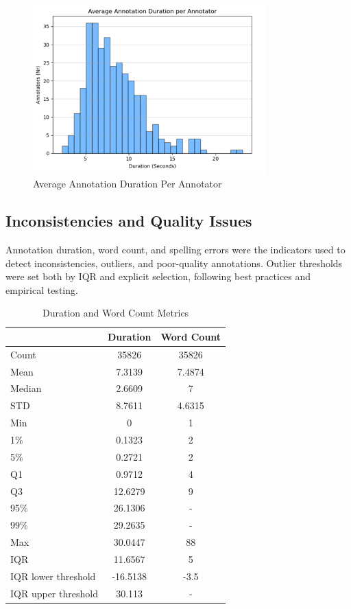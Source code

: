 \documentclass{article}
\begin{document}
\begin{figure}[H]
  \centering
  \includegraphics[width=0.8\textwidth]{figures/annotation_quality/average_annotation_duration_per_annotator.png}
  \caption{Average Annotation Duration Per Annotator}
  \label{fig:avg_duration}
\end{figure}

\subsection{Inconsistencies and Quality Issues}

Annotation duration, word count, and spelling errors were the indicators used to detect inconsistencies, outliers, and poor-quality annotations. Outlier thresholds were set both by IQR and explicit selection, following best practices and empirical testing.

\begin{table}[H]
  \caption{Duration and Word Count Metrics}
  \label{tab:duration_word}
  \centering
  \begin{tabular}{lcc}
    \toprule
    & Duration & Word Count \\
    \midrule
    Count & 35826 & 35826 \\
    Mean & 7.3139 & 7.4874 \\
    Median & 2.6609 & 7 \\
    STD & 8.7611 & 4.6315 \\
    Min & 0 & 1 \\
    1\% & 0.1323 & 2 \\
    5\% & 0.2721 & 2 \\
    Q1 & 0.9712 & 4 \\
    Q3 & 12.6279 & 9 \\
    95\% & 26.1306 & - \\
    99\% & 29.2635 & - \\
    Max & 30.0447 & 88 \\
    IQR & 11.6567 & 5 \\
    IQR lower threshold & -16.5138 & -3.5 \\
    IQR upper threshold & 30.113 & - \\
    \bottomrule
  \end{tabular}
\end{table}
\end{document}

